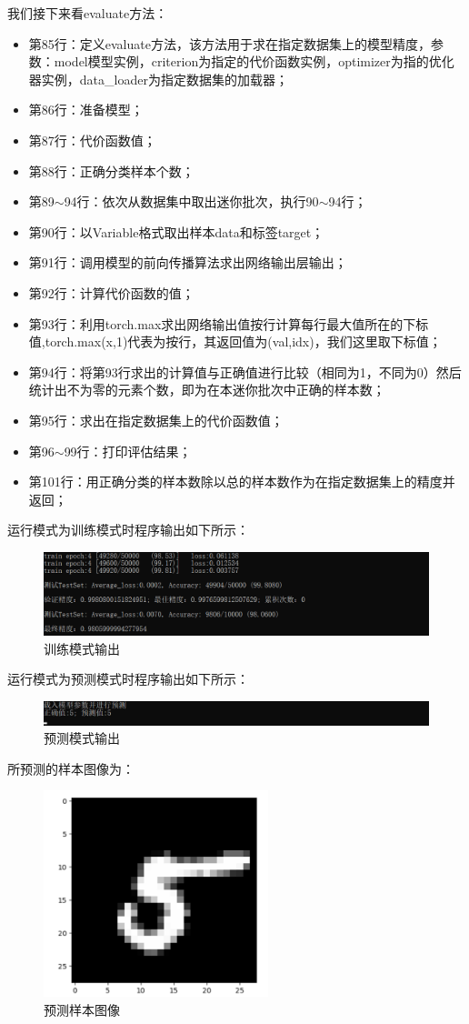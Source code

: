\documentclass[UTF8]{article}
\begin{document}
我们接下来看evaluate方法：
\begin{itemize}
\item 第85行：定义evaluate方法，该方法用于求在指定数据集上的模型精度，参数：model模型实例，criterion为指定的代价函数实例，optimizer为指的优化器实例，data\_loader为指定数据集的加载器；
\item 第86行：准备模型；
\item 第87行：代价函数值；
\item 第88行：正确分类样本个数；
\item 第89$\sim$94行：依次从数据集中取出迷你批次，执行90$\sim$94行；
\item 第90行：以Variable格式取出样本data和标签target；
\item 第91行：调用模型的前向传播算法求出网络输出层输出；
\item 第92行：计算代价函数的值；
\item 第93行：利用torch.max求出网络输出值按行计算每行最大值所在的下标值,torch.max(x,1)代表为按行，其返回值为(val,idx)，我们这里取下标值；
\item 第94行：将第93行求出的计算值与正确值进行比较（相同为1，不同为0）然后统计出不为零的元素个数，即为在本迷你批次中正确的样本数；
\item 第95行：求出在指定数据集上的代价函数值；
\item 第96$\sim$99行：打印评估结果；
\item 第101行：用正确分类的样本数除以总的样本数作为在指定数据集上的精度并返回；
\end{itemize}
运行模式为训练模式时程序输出如下所示：
\begin{figure}[H]
	\caption{训练模式输出}
	\label{f000078}
	\centering
	\includegraphics[width=15cm]{images/f000078}
\end{figure}
运行模式为预测模式时程序输出如下所示：
\begin{figure}[H]
	\caption{预测模式输出}
	\label{f000076}
	\centering
	\includegraphics[width=15cm]{images/f000076}
\end{figure}
所预测的样本图像为：
\begin{figure}[H]
	\caption{预测样本图像}
	\label{f000077}
	\centering
	\includegraphics[height=6cm]{images/f000077}
\end{figure}
\end{document}
